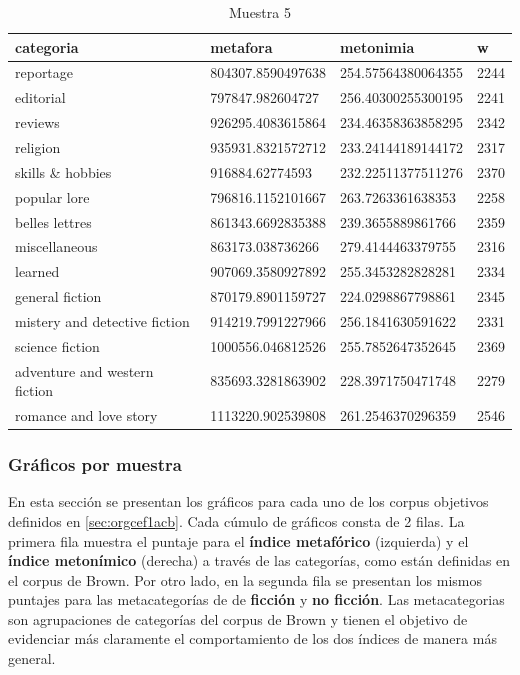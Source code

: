 \documentclass[12pt,letterpaper,twoside]{article}
\begin{document}
\begin{center}
\begin{longtable}{| p{} | p{} | p{}|p{}|}
\caption{Muestra 5}
    \hline
        categoria & metafora & metonimia & w \\ \hline
        reportage & 804307.8590497638 & 254.57564380064355 & 2244 \\ \hline
        editorial & 797847.982604727 & 256.40300255300195 & 2241 \\ \hline
        reviews & 926295.4083615864 & 234.46358363858295 & 2342 \\ \hline
        religion & 935931.8321572712 & 233.24144189144172 & 2317 \\ \hline
        skills \& hobbies & 916884.62774593 & 232.22511377511276 & 2370 \\ \hline
        popular lore & 796816.1152101667 & 263.7263361638353 & 2258 \\ \hline
        belles lettres & 861343.6692835388 & 239.3655889861766 & 2359 \\ \hline
        miscellaneous & 863173.038736266 & 279.4144463379755 & 2316 \\ \hline
        learned & 907069.3580927892 & 255.3453282828281 & 2334 \\ \hline
        general fiction & 870179.8901159727 & 224.0298867798861 & 2345 \\ \hline
        mistery and detective fiction & 914219.7991227966 & 256.1841630591622 & 2331 \\ \hline
        science fiction & 1000556.046812526 & 255.7852647352645 & 2369 \\ \hline
        adventure and western fiction & 835693.3281863902 & 228.3971750471748 & 2279 \\ \hline
        romance and love story & 1113220.902539808 & 261.2546370296359 & 2546 \\ \hline
\end{longtable}
    \label{muestra5}
\end{center}

\normalsize
\subsubsection{Gráficos por muestra}
\label{sec:org85d22b4}
En esta sección se presentan los gráficos para cada uno de los corpus objetivos
definidos en \ref{sec:orgcef1acb}. Cada cúmulo de gráficos consta de 2 filas.
La primera fila muestra el puntaje para el \textbf{índice metafórico} (izquierda) y
el \textbf{índice metonímico} (derecha) a través de las categorías, como están
definidas en el corpus de Brown. Por otro lado, en la segunda fila
se presentan los mismos puntajes para las metacategorías de de \textbf{ficción}
y \textbf{no ficción}. Las metacategorias son agrupaciones de categorías del corpus
de Brown y tienen el objetivo de evidenciar más claramente el comportamiento
de los dos índices de manera más general.
\end{document}
